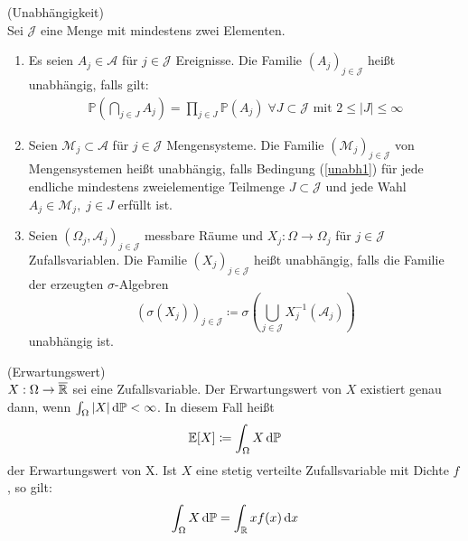 \begin{Definition}(Unabhängigkeit)\\
	Sei $ \mathcal{J} $ eine Menge mit mindestens zwei Elementen.
	\begin{enumerate}[label=(\alph*)]
		\item Es seien $ A_j \in \mathcal{A}$ für $ j \in \mathcal{J} $ Ereignisse. Die Familie $ (A_j)_{j \in \mathcal{J}} $ heißt unabhängig, falls gilt:
		\begin{align}
			\label{unabh1}
			\mathbb{P}\left( \bigcap_{j \in J} A_j \right) = \prod_{j \in J} \mathbb{P}(A_j) \; \forall J \subset\mathcal{J} \text{ mit } 2\leq|J|\leq\infty
		\end{align}
		\item Seien $ \mathcal{M}_j \subset \mathcal{A} $ für $ j \in \mathcal{J} $ Mengensysteme. Die Familie $ (\mathcal{M}_j)_{j \in \mathcal{J}} $ von Mengensystemen heißt unabhängig, falls Bedingung (\ref{unabh1}) für jede endliche mindestens zweielementige Teilmenge $ J \subset \mathcal{J} $ und jede Wahl $ A_j \in \mathcal{M}_j, \; j \in J $ erfüllt ist.
		\item Seien $ (\Omega_j,\mathcal{A}_j)_{j \in \mathcal{J}} $ messbare Räume und $ X_j : \Omega \to \Omega_j $ für $ j \in \mathcal{J} $ Zufallsvariablen.
		Die Familie $ (X_j)_{j \in \mathcal{J}} $ heißt unabhängig, falls die Familie der erzeugten $ \sigma $-Algebren \[ (\sigma(X_j))_{j \in \mathcal{J}} \coloneqq \sigma \left(\bigcup_{j \in \mathcal{J}} X_j^{-1}(\mathcal{A}_j) \right) \] unabhängig ist.
	\end{enumerate}	
\end{Definition} 
\begin{Definition}(Erwartungswert)\\
	$ X:\Omega \to \overline{\mathbb{R}} $ sei eine Zufallsvariable.
	Der Erwartungswert von $ X $ existiert genau dann, wenn $ \int_{\Omega} |X| \, \mathrm{d} \mathbb{P} < \infty $. In diesem Fall heißt
	\begin{align*}
	\mathbb{E}[X] \coloneqq \int_{\Omega} X \, \mathrm{d} \mathbb{P} 
	\end{align*}
	der Erwartungswert von X. 
	Ist $ X $ eine stetig verteilte Zufallsvariable mit Dichte $ f $, so gilt:
	\[
		\int_{\Omega} X \, \mathrm{d} \mathbb{P} = \int_{\mathbb{R}} x f(x) \, \mathrm{d} x
	\]
\end{Definition}

